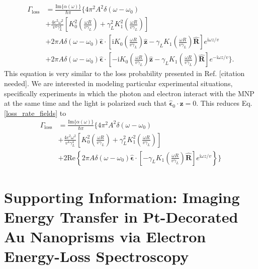 \documentclass [11pt, proquest] {uwthesis}[2016/11/22]
\begin{document}
\begin{equation}
\begin{aligned}
\Gamma_{\textrm{loss}} &= \frac{\textrm{Im}\{\alpha(\omega)\}}{\hbar\pi}\Big\{4\pi^2A^2\delta(\omega-\omega_0)\\
&+ \frac{4e^2\omega^2}{v^4\gamma_L^4}\left[K_0^2\left(\frac{\omega R}{v\gamma_L}\right) + \gamma_L^2 K_1^2\left(\frac{\omega R}{v\gamma_L}\right)\right]\\
&+ 2\pi A\delta(\omega-\omega_0)\hat{\boldsymbol{\epsilon}}\cdot\left[ \textrm{i}K_0\left( \frac{\omega R}{v\gamma_L} \right)\hat{\textbf{z}} - \gamma_L K_1\left( \frac{\omega R}{v\gamma_L} \right)\hat{\textbf{R}}\right]e^{\textrm{i}\omega z/v}\\
&+ 2\pi A\delta(\omega-\omega_0)\hat{\boldsymbol{\epsilon}}\cdot\left[ -\textrm{i}K_0\left( \frac{\omega R}{v\gamma_L} \right)\hat{\textbf{z}} - \gamma_L K_1\left( \frac{\omega R}{v\gamma_L} \right)\hat{\textbf{R}}\right]e^{-\textrm{i}\omega z/v} \Big\}.
\label{loss_rate_fields}
\end{aligned}
\end{equation}
This equation is very similar to the loss probability presented in Ref. [citation needed]. We are interested in modeling particular experimental situations, specifically experiments in which the photon and electron interact with the MNP at the same time and the light is polarized such that $\hat{\boldsymbol{\epsilon}}_0 \cdot \hat{\textbf{z}} = 0$. This reduces Eq. \ref{loss_rate_fields} to
\begin{equation}
\begin{aligned}
\Gamma_{\textrm{loss}} &= \frac{\textrm{Im}\{\alpha(\omega)\}}{\hbar\pi}\Big\{4\pi^2A^2\delta(\omega-\omega_0)\\
&+ \frac{4e^2\omega^2}{v^4\gamma_L^4}\left[K_0^2\left(\frac{\omega R}{v\gamma_L}\right) + \gamma_L^2 K_1^2\left(\frac{\omega R}{v\gamma_L}\right)\right]\\
&+ 2\textrm{Re}\left\{2\pi A\delta(\omega-\omega_0)\hat{\boldsymbol{\epsilon}}\cdot\left[ -\gamma_L K_1\left( \frac{\omega R}{v\gamma_L} \right)\hat{\textbf{R}}\right]e^{\textrm{i}\omega z/v}\right\}\Big\}
\label{loss_fields_realpart}
\end{aligned}
\end{equation}




%
\appendix
\raggedbottom\sloppy
 
\chapter{Supporting Information: Imaging Energy Transfer in Pt-Decorated Au Nanoprisms via Electron Energy-Loss Spectroscopy}
\end{document}
